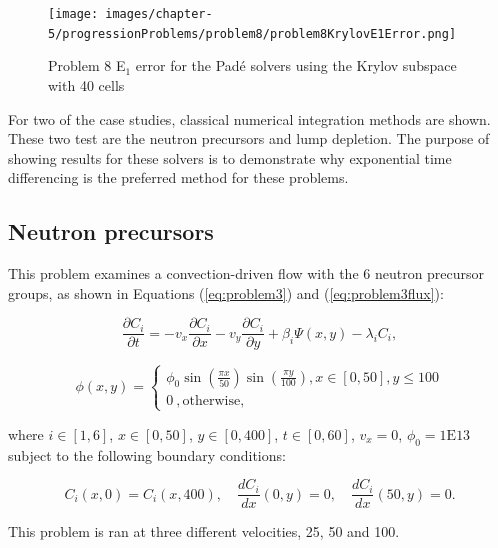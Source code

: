 \clearpage

\begin{figure}[p]
    \centering
    \texttt{[image: images/chapter-5/progressionProblems/problem8/problem8KrylovE1Error.png]}
    \caption{Problem 8 E${}_{1}$ error for the Pad\'e solvers using the Krylov subspace with 40 cells}
    \label{fig:problem8_E1_error_krylov}
\end{figure}

\clearpage

For two of the case studies, classical numerical integration methods are shown. These two test are the neutron precursors and lump depletion. The purpose of showing results for these solvers is to demonstrate why exponential time differencing is the preferred method for these problems.  

\subsection{Neutron precursors}
This problem examines a convection-driven flow with the 6 neutron precursor groups, as shown in Equations (\ref{eq:problem3}) and (\ref{eq:problem3flux}): 

\begin{equation}
\frac{\partial C_{i}}{\partial t} = -v_{x}\frac{\partial C_{i}}{\partial x} - v_{y}\frac{\partial C_{i}}{\partial y} + \beta_{i} \Psi (x, y) -\lambda_i C_{i},
\label{eq:problem3}
\end{equation}

\begin{equation}
\phi (x, y) = \begin{cases}
  \phi _0 \sin\left(\frac{\pi x}{50}\right)\sin\left(\frac{\pi y}{100}\right) , x \in [0,50], y \le 100 \\
  0\ , \text{otherwise},
  \label{eq:problem3flux}
\end{cases}
\end{equation}

\noindent where $i \in [1,6]$, $x \in [0, 50]$, $y \in [0, 400]$, $t \in [0, 60]$, $v_{x} = 0$, $\phi_0 = 1\text{E}13$ subject to the following boundary conditions:

\begin{equation}
    C_{i}(x,0) = C_{i}(x,400), \quad \frac{dC_{i}}{dx}(0,y) = 0, \quad \frac{dC_{i}}{dx}(50, y) = 0.
\end{equation}

\noindent This problem is ran at three different velocities, 25, 50 and 100. 

